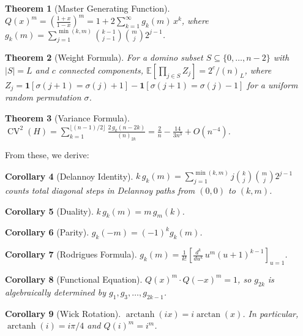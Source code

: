 \documentclass[11pt]{amsart}
\newtheorem{theorem}{Theorem}[section]
\newtheorem{corollary}[theorem]{Corollary}
\theoremstyle{definition}
\DeclareMathOperator{\CV}{CV}
\DeclareMathOperator{\arctanh}{arctanh}
\DeclareMathOperator{\arctan}{arctan}
\begin{document}
\begin{theorem}[Master Generating Function]\label{thm:master}
$\displaystyle Q(x)^m = \left(\frac{1+x}{1-x}\right)^m = 1 + 2\sum_{k=1}^{\infty} g_k(m)\, x^k$, where $g_k(m) = \sum_{j=1}^{\min(k,m)} \binom{k-1}{j-1}\binom{m}{j}2^{j-1}$.
\end{theorem}

\begin{theorem}[Weight Formula]\label{thm:weight}
For a domino subset $S \subseteq \{0,\ldots,n-2\}$ with $|S|=L$ and $c$ connected components, $\mathbb{E}[\prod_{j \in S} Z_j] = 2^c/(n)_L$, where $Z_j = \mathbf{1}[\sigma(j{+}1)=\sigma(j){+}1] - \mathbf{1}[\sigma(j{+}1)=\sigma(j){-}1]$ for a uniform random permutation $\sigma$.
\end{theorem}

\begin{theorem}[Variance Formula]\label{thm:cv2}
$\displaystyle \CV^2(H) = \sum_{k=1}^{\lfloor(n-1)/2\rfloor} \frac{2\,g_k(n-2k)}{(n)_{2k}} = \frac{2}{n} - \frac{14}{3n^3} + O(n^{-4})$.
\end{theorem}

From these, we derive:

\begin{corollary}[Delannoy Identity]\label{cor:delannoy}
$k\,g_k(m) = \sum_{j=1}^{\min(k,m)} j\binom{k}{j}\binom{m}{j}2^{j-1}$ counts total diagonal steps in Delannoy paths from $(0,0)$ to $(k,m)$.
\end{corollary}

\begin{corollary}[Duality]\label{cor:duality}
$k\,g_k(m) = m\,g_m(k)$.
\end{corollary}

\begin{corollary}[Parity]\label{cor:parity}
$g_k(-m) = (-1)^k g_k(m)$.
\end{corollary}

\begin{corollary}[Rodrigues Formula]\label{cor:rodrigues}
$g_k(m) = \frac{1}{k!}\left[\frac{d^k}{du^k}\,u^m(u+1)^{k-1}\right]_{u=1}$.
\end{corollary}

\begin{corollary}[Functional Equation]\label{cor:functeq}
$Q(x)^m \cdot Q(-x)^m = 1$, so $g_{2k}$ is algebraically determined by $g_1, g_3, \ldots, g_{2k-1}$.
\end{corollary}

\begin{corollary}[Wick Rotation]\label{cor:wick}
$\arctanh(ix) = i\arctan(x)$. In particular, $\arctanh(i) = i\pi/4$ and $Q(i)^m = i^m$.
\end{corollary}
\end{document}

